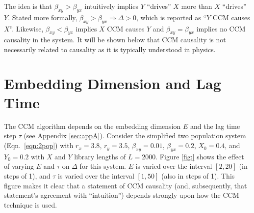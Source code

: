 \documentclass[a4paper,11pt]{article}
\begin{document}
The idea is that $\beta_{xy}>\beta_{yx}$ intuitively implies $Y$ ``drives'' $X$ more than $X$ ``drives'' $Y$.  Stated more formally, $\beta_{xy}>\beta_{yx}\Rightarrow\Delta>0$, which is reported as ``$Y$ CCM causes $X$''.  Likewise, $\beta_{xy}<\beta_{yx}$ implies $X$ CCM causes $Y$ and $\beta_{xy}=\beta_{yx}$ implies no CCM causality in the system.  It will be shown below that CCM causality is not necessarily related to causality as it is typically understood in physics.

\section{Embedding Dimension and Lag Time}
The CCM algorithm depends on the embedding dimension $E$ and the lag time step $\tau$ (see Appendix \ref{sec:appA}).  Consider the simplified two population system (Eqn.\ \ref{eqn:2pop}) with $r_x=3.8$, $r_y=3.5$, $\beta_{xy}=0.01$, $\beta_{yx}=0.2$, $X_0=0.4$, and $Y_0=0.2$ with $X$ and $Y$ library lengths of $L=2000$.  Figure \ref{fig:} shows the effect of varying $E$ and $\tau$ on $\Delta$ for this system.  $E$ is varied over the interval $[2,20]$ (in steps of 1), and $\tau$ is varied over the interval $[1,50]$ (also in steps of 1).  This figure makes it clear that a statement of CCM causality (and, subsequently, that statement's agreement with ``intuition'') depends strongly upon how the CCM technique is used.
\end{document}
